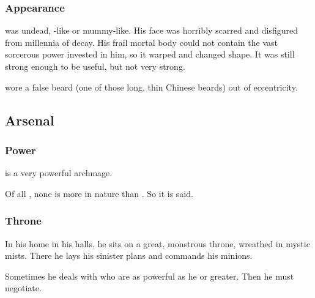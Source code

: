 \subsubsection{Appearance}
\Psyrex was undead, \Lich-like or mummy-like. 
His face was horribly scarred and disfigured from millennia of decay.
His frail mortal body could not contain the vast sorcerous power invested in him, so it warped and changed shape.
It was still strong enough to be useful, but not very strong.

\Psyrex{} wore a false beard (one of those long, thin Chinese beards) out of eccentricity. 








\subsection{Arsenal}





\subsubsection{Power}
\Psyrex{} is a very powerful archmage.

Of all \scathae, none is more \draconian{} in nature than \LocarPsyrex. 
So it is said. 





\subsubsection{Throne}
In his home in his \daemonic{} halls, he sits on a great, monstrous throne, wreathed in mystic mists. There he lays his sinister plans and commands his \daemonic{} minions. 

Sometimes he deals with \daemons{} who are as powerful as he or greater. Then he must negotiate. 







